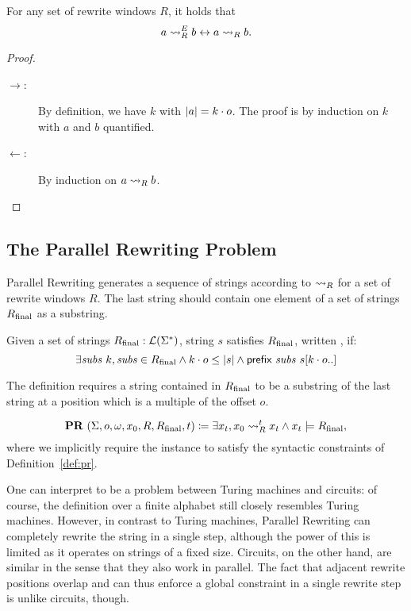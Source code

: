 \begin{lemma}\label{lem:agree_valid}
  For any set of rewrite windows $R$, it holds that 
  \[a \rightsquigarrow_{R}^E b \leftrightarrow a \rightsquigarrow_{R} b. \]
\end{lemma}
\begin{proof}
  \begin{description}
    \item[$\rightarrow$:]
      By definition, we have $k$ with $|a| = k \cdot o$. The proof is by induction on $k$ with $a$ and $b$ quantified.
    \item[$\leftarrow$:]
      By induction on $a \rightsquigarrow_{R} b$. 
  \end{description}
\end{proof}

\subsection{The Parallel Rewriting Problem}
Parallel Rewriting generates a sequence of strings according to $\rightsquigarrow_{R}$ for a set of rewrite windows $R$. The last string should contain one element of a set of strings $R_{\text{final}}$ as a substring.
\begin{definition}
  Given a set of strings $R_{\text{final}} : \mathcal{L} (\Sigma^*)$, string $s$ satisfies $R_{\text{final}}$, written , if:
  \[\exists \mathit{subs}~k, \mathit{subs} \in R_{\text{final}} \land k \cdot o \le |s| \land \textsf{prefix}~\mathit{subs}~s[k \cdot o..] \]
\end{definition}
The definition requires a string contained in $R_{\text{final}}$ to be a substring of the last string at a position which is a multiple of the offset $o$.

\begin{definition}
  \mnote[PRLang]{\PR{}}
  \[\textbf{PR}{}~(\Sigma, o, \omega, x_0, R, R_{\text{final}}, t) \coloneqq \exists x_t, x_0 \rightsquigarrow_{R}^t x_t \land x_t \models R_{\text{final}}, \]
  where we implicitly require the instance to satisfy the syntactic constraints of Definition~\ref{def:pr}. 
\end{definition}

One can interpret \PR{} to be a problem between Turing machines and circuits: of course, the definition over a finite alphabet still closely resembles Turing machines. However, in contrast to Turing machines, Parallel Rewriting can completely rewrite the string in a single step, although the power of this is limited as it operates on strings of a fixed size. 
Circuits, on the other hand, are similar in the sense that they also work in parallel. The fact that adjacent rewrite positions overlap and can thus enforce a global constraint in a single rewrite step is unlike circuits, though. 

